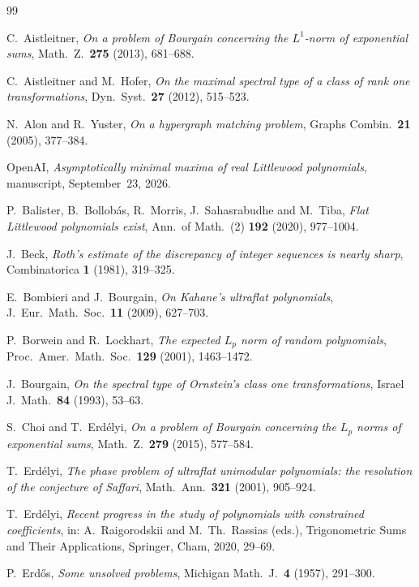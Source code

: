 \documentclass[11pt,reqno]{amsart}
\theoremstyle{definition}
\begin{document}
\begin{thebibliography}{99}

 C.~Aistleitner, \emph{On a problem of Bourgain concerning the $L^1$-norm of exponential sums}, Math.\ Z.\ \textbf{275} (2013), 681--688.

 C.~Aistleitner and M.~Hofer, \emph{On the maximal spectral type of a class of rank one transformations}, Dyn.\ Syst.\ \textbf{27} (2012), 515--523.

 N.~Alon and R.~Yuster, \emph{On a hypergraph matching problem}, Graphs Combin.\ \textbf{21} (2005), 377--384.

 OpenAI, \emph{Asymptotically minimal maxima of real Littlewood polynomials}, manuscript, September~23, 2026.

 P.~Balister, B.~Bollob\'as, R.~Morris, J.~Sahasrabudhe and M.~Tiba, \emph{Flat Littlewood polynomials exist}, Ann.\ of Math.\ (2) \textbf{192} (2020), 977--1004.

 J.~Beck, \emph{Roth's estimate of the discrepancy of integer sequences is nearly sharp}, Combinatorica \textbf{1} (1981), 319--325.

 E.~Bombieri and J.~Bourgain, \emph{On Kahane's ultraflat polynomials}, J.\ Eur.\ Math.\ Soc.\ \textbf{11} (2009), 627--703.

 P.~Borwein and R.~Lockhart, \emph{The expected $L_p$ norm of random polynomials}, Proc.\ Amer.\ Math.\ Soc.\ \textbf{129} (2001), 1463--1472.

 J.~Bourgain, \emph{On the spectral type of Ornstein's class one transformations}, Israel J.\ Math.\ \textbf{84} (1993), 53--63.

 S.~Choi and T.~Erd\'elyi, \emph{On a problem of Bourgain concerning the $L_p$ norms of exponential sums}, Math.\ Z.\ \textbf{279} (2015), 577--584.

 T.~Erd\'elyi, \emph{The phase problem of ultraflat unimodular polynomials: the resolution of the conjecture of Saffari}, Math.\ Ann.\ \textbf{321} (2001), 905--924.

 T.~Erd\'elyi, \emph{Recent progress in the study of polynomials with constrained coefficients}, in: A.~Raigorodskii and M.~Th.~Rassias (eds.), Trigonometric Sums and Their Applications, Springer, Cham, 2020, 29--69.

 P.~Erd\H{o}s, \emph{Some unsolved problems}, Michigan Math.\ J.\ \textbf{4} (1957), 291--300.


\end{thebibliography}
\end{document}
